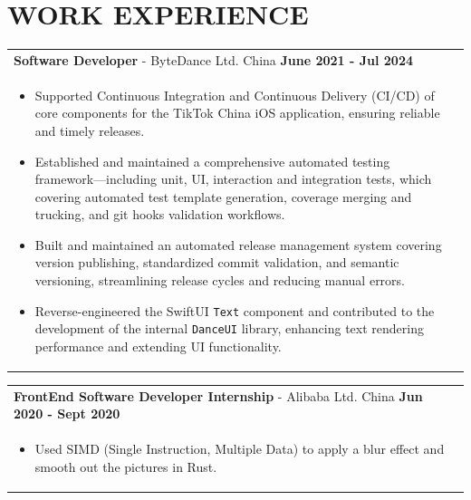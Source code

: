 \documentclass[a4paper,11pt]{article}
\begin{document}
\section{\textbf{WORK EXPERIENCE}}
\begin{tabularx}{\linewidth}{ @{}l r@{} }
\textbf{Software Developer} - ByteDance Ltd. China \hfill \textbf{June 2021 - Jul 2024} \\[4pt]
\begin{minipage}[t]{\linewidth}
    \begin{itemize}[nosep,after=\strut, leftmargin=1em, itemsep=2pt]
        \item Supported Continuous Integration and Continuous Delivery (CI/CD) of core components for the TikTok China iOS application, ensuring reliable and timely releases.
        \item Established and maintained a comprehensive automated testing framework—including unit, UI, interaction and integration tests, which covering automated test template generation, coverage merging and trucking, and git hooks validation workflows.
        \item Built and maintained an automated release management system covering version publishing, standardized commit validation, and semantic versioning, streamlining release cycles and reducing manual errors.
        \item Reverse-engineered the SwiftUI \texttt{Text} component and contributed to the development of the internal \texttt{DanceUI} library, enhancing text rendering performance and extending UI functionality.
    \end{itemize}    
\end{minipage}
\end{tabularx}
\begin{tabularx}{\linewidth}{ @{}l r@{} }
\textbf{FrontEnd Software Developer Internship} - Alibaba Ltd. China \hfill \textbf{Jun 2020 - Sept 2020} \\[4pt]
\begin{minipage}[t]{\linewidth}
    \begin{itemize}[nosep,after=\strut, leftmargin=1em, itemsep=2pt]
        \item Used SIMD (Single Instruction, Multiple Data) to apply a blur effect and smooth out the pictures in Rust.
    \end{itemize}
\end{minipage}
\end{tabularx}

\hfill
\end{document}
